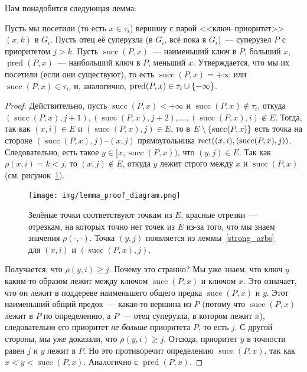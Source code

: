 Нам понадобится следующая лемма:

\begin{lemma}\label{visited_parent}
	Пусть мы посетили (то есть $x \in \tau_i$) вершину с парой <<ключ--приоритет>> $(x, k)$ в $G_i$. Пусть отец её суперузла (в $G_i$, всё пока в $G_i$)~--- суперузел $P$ с приоритетом $j > k$.
	Пусть $\operatorname{succ}(P, x)$~--- наименьший ключ в $P$, больший $x$, $\operatorname{pred}(P, x)$~--- наибольший ключ в $P$, меньший $x$.
	Утверждается, что мы их посетили (если они существуют), то есть $\operatorname{succ}(P, x) = +\infty$ или $\operatorname{succ}(P, x) \in \tau_i$, и, аналогично, $\operatorname{pred}(P, x) \in \tau_i \cup \lbrace-\infty\rbrace$.
\end{lemma}
\begin{proof}
	Действительно, пусть $\operatorname{succ}(P, x) < +\infty$ и $\operatorname{succ}(P, x) \notin \tau_i$, откуда $(\operatorname{succ}(P, x), j + 1), (\operatorname{succ}(P, x), j + 2), \ldots, (\operatorname{succ}(P, x), i) \notin E$. Тогда, так как $(x, i) \in E$ и $(\operatorname{succ}(P, x), j) \in E$, то в $E \setminus \lbrace\operatorname{succ}(P, x)\rbrace$ есть точка на стороне $(\operatorname{succ}(P, x), j)$--$(x,j)$ прямоугольника $\operatorname{rect}((x, i), (\operatorname{succ}(P, x), j))$. Следовательно, есть такое $y \in [x, \operatorname{succ}(P, x))$, что $(y, j) \in E$. Так как $\rho(x, i) = k < j$, то $(x, j) \notin E$, откуда $y$ лежит строго между $x$ и $\operatorname{succ}(P, x)$ (см. рисунок~\ref{proof_diagram}).

	\begin{figure} \centering
		\texttt{[image: img/lemma\_proof\_diagram.png]}

		\caption{Зелёные точки соответствуют точкам из $E$, красные отрезки~--- отрезкам, на которых точно нет точек из $E$ из-за того, что мы знаем значения
			$\rho(\cdot, \cdot)$. Точка $(y, j)$ появляется из леммы~\ref{strong_arbs} для $(x, i)$ и
			$(\operatorname{succ}(P, x), j)$.}
		\label{proof_diagram}
	\end{figure}

	Получается, что $\rho(y, i) \geqslant j$. Почему это странно? Мы уже знаем, что ключ $y$ каким-то образом лежит между ключом $\operatorname{succ}(P, x)$ и ключом $x$. Это означает, что он лежит в поддереве наименьшего общего предка
	$\operatorname{succ}(P, x)$ и $y$. Этот наименьший общий предок~--- какая-то вершина из $P$ (потому что $\operatorname{succ}(P, x)$ лежит в $P$ по определению, а $P$~--- отец суперузла, в котором лежит $x$), следовательно его приоритет \emph{не больше} приоритета $P$, то есть $j$. С другой стороны, мы уже доказали, что $\rho(y, i) \geqslant j$. Отсюда, приоритет $y$ в точности равен $j$ и $y$ лежит в $P$. Но это противоречит определению $\operatorname{succ}(P, x)$, так как $x < y < \operatorname{succ}(P, x)$. Аналогично с $\operatorname{pred}(P, x)$.

\end{proof}

